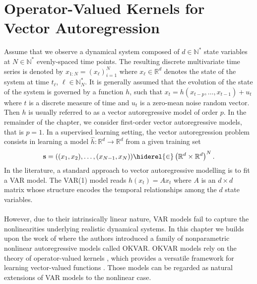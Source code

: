 \section{Operator-Valued Kernels for Vector Autoregression}
Assume that we observe a dynamical system composed of $d\in\mathbb{N}^*$ state
variables at $N\in\mathbb{N}^*$ evenly-spaced time points. The resulting
discrete multivariate time series is denoted by $x_{1:N}=(x_\ell)_{i=1}^N$
where $x_\ell\in\mathbb{R}^d$ denotes the state of the system at time
$t_\ell$, $\ell\in\mathbb{N}_N^*$. It is generally assumed that the evolution
of the state of the system is governed by a function $h$, such that
$x_{t}=h(x_{t-p},\dots,x_{t-1}) + u_{t}$ where $t$ is a discrete
measure of time and $u_t$ is a zero-mean noise random vector. %
Then $h$ is usually referred to as a vector autoregressive model of order $p$.
In the remainder of the chapter, we consider first-order vector autoregressive
models, that is $p=1$. In a supervised learning setting, the vector
autoregression problem consists in learning a model $\hat{h}:\mathbb{R}^d \to
\mathbb{R}^d$ from a given training set
\begin{dmath*}
    \seq{s} = ((x_{1},x_{2}),\dots,(x_{N-1},x_{N}))\hiderel{\in}
    \left(\mathbb{R}^d\times\mathbb{R}^d\right)^N.
\end{dmath*}
In the literature, a standard approach to vector autoregressive modelling is to
fit a \ac{VAR} model. The \ac{VAR}(1) model reads $h(x_t) = Ax_t$ where $A$
is an $d\times d$ matrix whose structure encodes the temporal relationships
among the $d$ state variables.
\paragraph{}
However, due to their intrinsically linear nature, \acs{VAR} models fail to
capture the nonlinearities underlying realistic dynamical systems. In this
chapter we builds upon the work of \citet{Lim2015} where the authors introduced
a family of nonparametric nonlinear autoregressive models called \ac{OKVAR}.
\ac{OKVAR} models rely on the theory of operator-valued kernels
\cite{Pedrick57, Senkene73}, which provides a versatile framework for learning
vector-valued functions \citep{Micchelli2005,Carmeli2010,Alvarez2012}. Those
models can be regarded as natural extensions of VAR models to the nonlinear
case.
